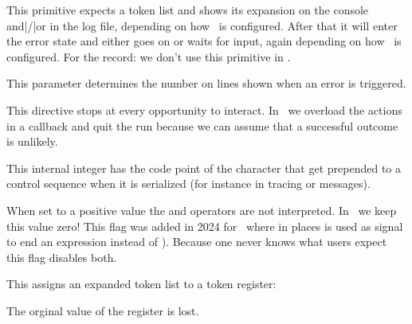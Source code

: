 \stopoldprimitive

\startoldprimitive[title={\prm {errmessage}}]

This primitive expects a token list and shows its expansion on the console
and|/|or in the log file, depending on how \TEX\ is configured. After that it
will enter the error state and either goes on or waits for input, again depending
on how \TEX\ is configured. For the record: we don't use this primitive in
\CONTEXT.

\stopoldprimitive

\startoldprimitive[title={\prm {errorcontextlines}}]

This parameter determines the number on lines shown when an error is triggered.

\stopoldprimitive

\startoldprimitive[title={\prm {errorstopmode}}]

This directive stops at every opportunity to interact. In \CONTEXT\ we overload
the actions in a callback and quit the run because we can assume that a
successful outcome is unlikely.

\stopoldprimitive

\startoldprimitive[title={\prm {escapechar}}]

This internal integer has the code point of the character that get prepended to a
control sequence when it is serialized (for instance in tracing or messages).

\stopoldprimitive

\startnewprimitive[title={\prm {etexexprmode}}]

When set to a positive value the \type {:} and \type {;} operators are not
interpreted. In \CONTEXT\ we keep this value zero! This flag was added in 2024
for \LATEX\ where in places \type {;} is used as signal to end an expression
instead of \type {\relax}). Because one never knows what users expect this flag
disables both.

\stopnewprimitive

\startnewprimitive[title={\prm {etoks}}]

This assigns an expanded token list to a token register:

\starttyping
\def\temp{less stuff}
\etoks\scratchtoks{a bit \temp}
\stoptyping

The orginal value of the register is lost.

\stopnewprimitive

\startnewprimitive[title={\prm {etoksapp}}]

